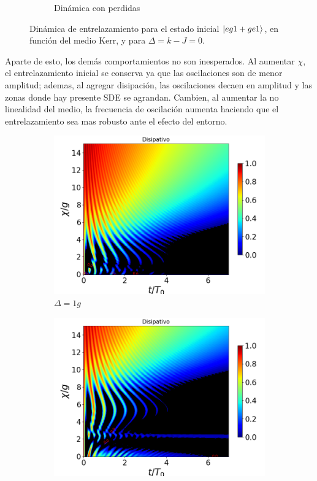 \begin{figure}[h!]
\begin{subfigure}{0.49\textwidth}
        \caption{Dinámica con perdidas}
        \label{fig4:concu x 1 dis}
    \end{subfigure}
    \caption{Dinámica de entrelazamiento para el estado inicial $\ket{eg1+ge1}$, en función del medio Kerr, y para $\Delta=k-J=0$.}
    \label{fig4:concu x 1}
\end{figure}
Aparte de esto, los demás comportamientos no son inesperados. Al aumentar $\chi$, el entrelazamiento inicial se conserva ya que las oscilaciones son de menor amplitud; ademas, al agregar disipación, las oscilaciones decaen en amplitud y las zonas donde hay presente SDE se agrandan. Cambien, al aumentar la no linealidad del medio, la frecuencia de oscilación aumenta haciendo que el entrelazamiento sea mas robusto ante el efecto del entorno.
\begin{figure}[h!]
    \centering
    \begin{subfigure}{0.49\textwidth}
        \includegraphics[width=\textwidth]{figuras/ch4/concu/chi/eg1+ge1 d=1.0g k=0.0g J=0.0g gamma=0.25g concu chi dis.png}
        \caption{$\Delta=1g$}
        \label{fig4:concu x 1 d1}
    \end{subfigure}
    \hfill
    \begin{subfigure}{0.49\textwidth}
        \includegraphics[width=\textwidth]{figuras/ch4/concu/chi/eg1+ge1 d=5.0g k=0.0g J=0.0g gamma=0.25g concu chi dis.png}

\end{subfigure}
\end{figure}
